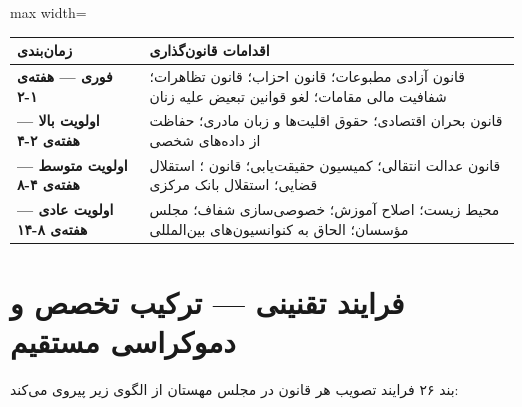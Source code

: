\vspace{0.5\baselineskip}
\noindent
\begin{adjustbox}{max width=\linewidth}
	\begin{tabular}{@{}lp{12cm}@{}}
		\toprule
		\textbf{زمان‌بندی} & \textbf{اقدامات قانون‌گذاری} \\
		\midrule
		\rowcolor{DangerBg}
		\textbf{فوری --- هفته‌ی ۱-۲} &
		قانون آزادی مطبوعات؛ قانون احزاب؛ قانون تظاهرات؛ شفافیت مالی مقامات؛
		لغو قوانین تبعیض علیه زنان \\
		\addlinespace
		\rowcolor{WarningBg}
		\textbf{اولویت بالا --- هفته‌ی ۲-۴} &
		قانون بحران اقتصادی؛ حقوق اقلیت‌ها و زبان مادری؛ حفاظت از داده‌های شخصی \\
		\addlinespace
		\rowcolor{NodeBg}
		\textbf{اولویت متوسط --- هفته‌ی ۴-۸} &
		قانون عدالت انتقالی؛ کمیسیون حقیقت‌یابی؛ قانون \lr{SSR}؛
		استقلال قضایی؛ استقلال بانک مرکزی \\
		\addlinespace
		\rowcolor{SuccessBg}
		\textbf{اولویت عادی --- هفته‌ی ۸-۱۴} &
		محیط زیست؛ اصلاح آموزش؛ خصوصی‌سازی شفاف؛ مجلس مؤسسان؛
		الحاق به کنوانسیون‌های بین‌المللی \\
		\bottomrule
	\end{tabular}
\end{adjustbox}
\vspace{0.5\baselineskip}

\section{فرایند تقنینی --- ترکیب تخصص و دموکراسی مستقیم}

\begin{bandbox}{بند ۲۶}
	فرایند تصویب هر قانون در مجلس مهستان از الگوی زیر پیروی می‌کند:
\end{bandbox}

